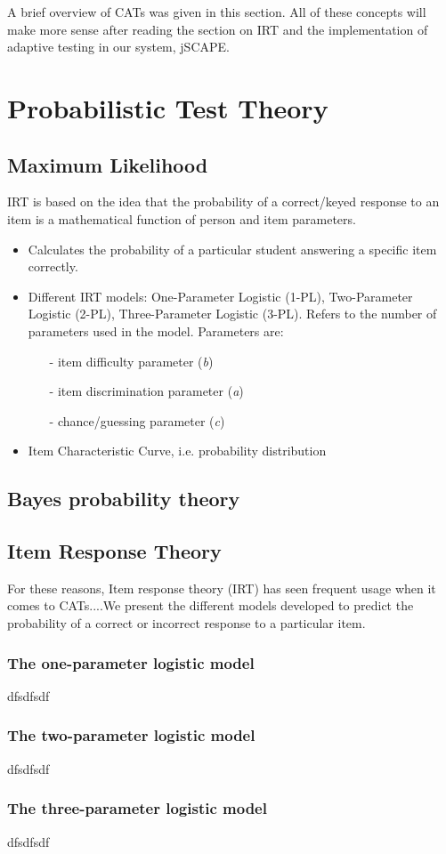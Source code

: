 A brief overview of CATs was given in this section. All of these concepts will make more sense after reading the section on IRT and the implementation of adaptive testing in our system, jSCAPE.

\section{Probabilistic Test Theory}
\subsection{Maximum Likelihood}

IRT is based on the idea that the probability of a correct/keyed response to an item is a mathematical function of person and item parameters. 

\begin{itemize}
\item Calculates the probability of a particular student answering a specific item correctly.
\item Different IRT models: One-Parameter Logistic (1-PL), Two-Parameter Logistic (2-PL), Three-Parameter Logistic (3-PL). Refers to the number of parameters used in the model. Parameters are: 

\begin{itemize}
\item[-] item difficulty parameter (\textit{b})
\item[-] item discrimination parameter (\textit{a})
\item[-] chance/guessing parameter (\textit{c})
\end{itemize}

\item Item Characteristic Curve, i.e. probability distribution
\end{itemize}

\subsection{Bayes probability theory}

\subsection{Item Response Theory}
\label{subsec:IRT}
For these reasons, Item response theory (IRT) has seen frequent usage when it comes to CATs....We present the different models developed to predict the probability of a correct or incorrect response to a particular item.
\subsubsection{The one-parameter logistic model}
dfsdfsdf
\subsubsection{The two-parameter logistic model}
dfsdfsdf
\subsubsection{The three-parameter logistic model}
dfsdfsdf
